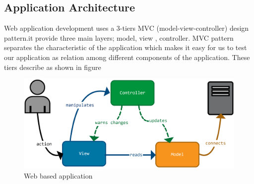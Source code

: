 \subsection{Application Architecture}
\hspace{2cm}Web application development uses a 3-tiers MVC (model-view-controller) design pattern.it provide three main layers; model, view , controller. MVC pattern separates the characteristic of the application which makes it easy for us to test our application as relation among different components of the application. These tiers describe as shown in figure
\begin{figure}%
    \center%
    \includegraphics[width=1\textwidth]{images/Software/MVC2.png}%
    \caption[Web based application]{Web based application}\label{fig: login}%
  \end{figure}
